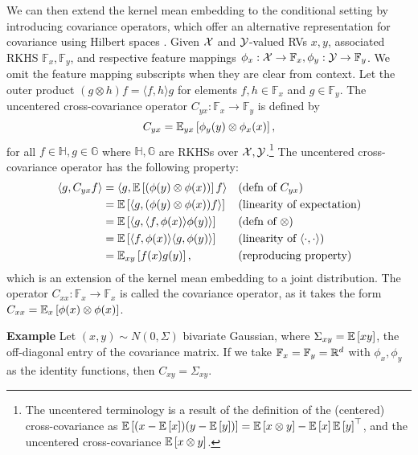 \documentclass{article}
\begin{document}
We can then extend the kernel mean embedding to the conditional setting
by introducing covariance operators, which offer an alternative
representation for covariance using Hilbert spaces \citep{baker1970,baker1973}.
Given $\mathcal{X}$ and $\mathcal{Y}$-valued RVs $x,y$, associated
RKHS $\mathbb{F}_x,\mathbb{F}_y$, and respective feature mappings
$\phi_x:\mathcal{X}\to\mathbb{F}_x,\phi_y:\mathcal{Y}\to\mathbb{F}_y$.
We omit the feature mapping subscripts when they are clear from context.
Let the outer product $(g \otimes h)f = \langle f,h\rangle g$ for elements
$f,h\in\mathbb{F}_x$ and $g\in\mathbb{F}_y$.
The uncentered cross-covariance operator $C_{yx}: \mathbb{F}_x\to\mathbb{F}_y$ is defined by
\begin{equation}
    \label{eqn:xcov}
    C_{yx} = \mathbb{E}_{yx}\left[\phi_y(y)\otimes\phi_x(x)\right],
\end{equation}
for all $f\in\mathbb{H},g\in\mathbb{G}$ where $\mathbb{H},\mathbb{G}$ are
RKHSs over $\mathcal{X},\mathcal{Y}$.\footnote{
The uncentered terminology is a result of the definition of the (centered) cross-covariance
as $\mathbb{E}\left[(x - \mathbb{E}\left[x\right])(y - \mathbb{E}\left[y\right])\right] = \mathbb{E}\left[x\otimes y\right] - \mathbb{E}\left[x\right]\mathbb{E}\left[y\right]^\top$,
and the uncentered cross-covariance $\mathbb{E}\left[x\otimes y\right]$.
}
The uncentered cross-covariance operator has the following property:
\begin{equation}
    \label{eqn:xcove}
    \begin{aligned}
    \langle g, C_{yx}f\rangle
    &= \langle g, \mathbb{E}\left[(\phi(y)\otimes\phi(x))\right]f\rangle && \text{(defn of }C_{yx})\\
    &= \mathbb{E}\left[\langle g, (\phi(y)\otimes\phi(x))f\rangle\right] && \text{(linearity of expectation)}\\
    &= \mathbb{E}\left[\langle g, \langle f, \phi(x)\rangle \phi(y)\rangle\right] && \text{(defn of }\otimes)\\
    &= \mathbb{E}\left[\langle f, \phi(x)\rangle\langle g, \phi(y)\rangle\right] && \text{(linearity of }\langle\cdot,\cdot\rangle)\\
    &= \mathbb{E}_{xy}\left[f(x)g(y)\right], && \text{(reproducing property)}
    \end{aligned}
\end{equation}
which is an extension of the kernel mean embedding to a joint distribution.
The operator $C_{xx}:\mathbb{F}_x\to\mathbb{F}_x$ is called the covariance operator,
as it takes the form $C_{xx} = \mathbb{E}_{x}\left[\phi(x)\otimes\phi(x)\right]$.

\textbf{Example}
Let $(x,y)\sim N(0,\Sigma)$ bivariate Gaussian,
where $\Sigma_{xy} = \mathbb{E}\left[xy\right]$, the off-diagonal
entry of the covariance matrix.
If we take $\mathbb{F}_x=\mathbb{F}_y=\mathbb{R}^d$
with $\phi_x,\phi_y$ as the identity functions,
then $C_{xy} = \Sigma_{xy}$.
\end{document}
